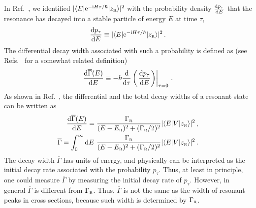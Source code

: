\documentclass[12pt]{article}
\newcommand{\rmi}{{\rm i}}
\newcommand{\rme}{{\rm e}}
\newcommand{\rmd}{{\rm d}}
\newcommand{\gs}{|z_{\text{\tiny R}}\rangle}
\newcommand{\zr}{z_{\text{\tiny R}}}
\newcommand{\gr}{\Gamma _{\text{\tiny R}}}
\newcommand{\er}{E_{\text{\tiny R}}}
\begin{document}
In Ref.~\cite{NPA15}, we identified 
$|\langle E|\rme ^{-\rmi H\tau /\hbar}|\zr \rangle|^{2}$ with
the probability density $\frac{\rmd p_{\tau}}{\rmd E}$ 
that the resonance has decayed into a stable particle of energy $E$ at
time $\tau$,
\begin{equation}
      \frac{\rmd p_{\tau}}{\rmd E}\equiv 
         |\langle E|\rme ^{-\rmi H\tau /\hbar}|\zr \rangle|^{2}  \, .
             \label{detdpd}
\end{equation}
The differential decay width associated with such a probability is defined
as (see Refs.~\cite{ANDREASSEN1,ANDREASSEN2} for a somewhat related definition)
\begin{equation}
      \frac{\rmd \overline{\Gamma} (E)}{\rmd E}  \equiv
         -\hbar \frac{\rmd}{\rmd \tau}\left(
               \left.\frac{\rmd  p_{\tau}}{\rmd E}\right)
                   \right|_{\tau =0}    \, .
             \label{diffdr}
\end{equation}
As shown in Ref.~\cite{NPA15}, the differential and the total decay widths of a 
resonant state can be written as
\begin{eqnarray}
   \frac{\rmd \overline{\Gamma} (E)}{\rmd E}=
       \frac{\gr}{(E-\er)^2+(\gr/2)^2} |\langle E|V \gs|^2 \, , 
         \label{inteGam6n}  \\
           \overline{\Gamma} = \int_0^{\infty} \rmd E \
       \frac{\gr}{(E-\er)^2+(\gr/2)^2} |\langle E|V \gs|^2 \, . 
         \label{inteGam6totaln}
\end{eqnarray}
The decay width $\overline{\Gamma}$ has units of energy, and physically
can be interpreted as the initial decay rate associated with 
the probability $p_{\tau}$. Thus, at least in principle, one could measure
$\overline{\Gamma}$ by measuring the initial decay rate of 
$p_{\tau}$. However, in general $\overline{\Gamma}$ is different from $\gr$.
Thus, $\overline{\Gamma}$ is not the same as the width of resonant
peaks in cross sections, because such width is determined by $\gr$.
\end{document}
